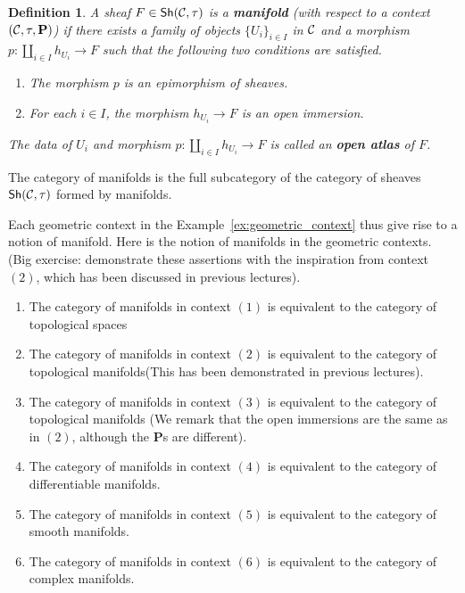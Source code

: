 \documentclass{tufte-book} %
\numberwithin{dummy}{section}
\newtheorem{dfn}[thm]{Definition}
\newcommand{\calc}{{\cal C}}
\newcommand{\lrta}{\longrightarrow}
\newcommand{\ssh}{\mathsf{Sh}}
\newcommand{\bfp}{\mathbf{P}}
\begin{document}
\begin{dfn}
A sheaf $F\in \ssh(\calc,\tau)$ is a \textbf{manifold} (with respect to a context $(\calc,\tau,\bfp)$) if there exists a family of objects $\{U_i\}_{i\in I}$ in $\calc$ and a morphism $p:\coprod_{i\in I}h_{U_i}\lrta F$ such that the following two conditions are satisfied.
\begin{enumerate}
\item The morphism $p$ is an epimorphism of sheaves.
\item For each $i\in I$, the morphism $h_{U_i}\lrta F$ is an open immersion.
\end{enumerate}
The data of $U_i$ and morphism $p:\coprod_{i\in I} h_{U_i}\lrta F$ is called an \textbf{open atlas} of $F$.
\end{dfn}
The category of manifolds is the full subcategory of the category of sheaves $\ssh(\calc,\tau)$ formed by manifolds.

Each geometric context in the Example~\ref{ex:geometric_context} thus give rise to a notion of manifold. Here is the notion of manifolds in the geometric contexts. (Big exercise: demonstrate these assertions with the inspiration from context $(2)$, which has been discussed in previous lectures).
\begin{enumerate}
\item The category of manifolds in context $(1)$ is equivalent to the category of topological spaces
\item The category of manifolds in context $(2)$ is equivalent to the category of topological manifolds(This has been demonstrated in previous lectures).
\item The category of manifolds in context $(3)$ is equivalent to the category of topological manifolds
(We remark that the open immersions are the same as in $(2)$, although the $\bfp$s are different).
\item The category of manifolds in context $(4)$ is equivalent to the category of differentiable manifolds.
\item The category of manifolds in context $(5)$ is equivalent to the category of smooth manifolds.
\item The category of manifolds in context $(6)$ is equivalent to the category of complex manifolds.
\end{enumerate}
\end{document}
